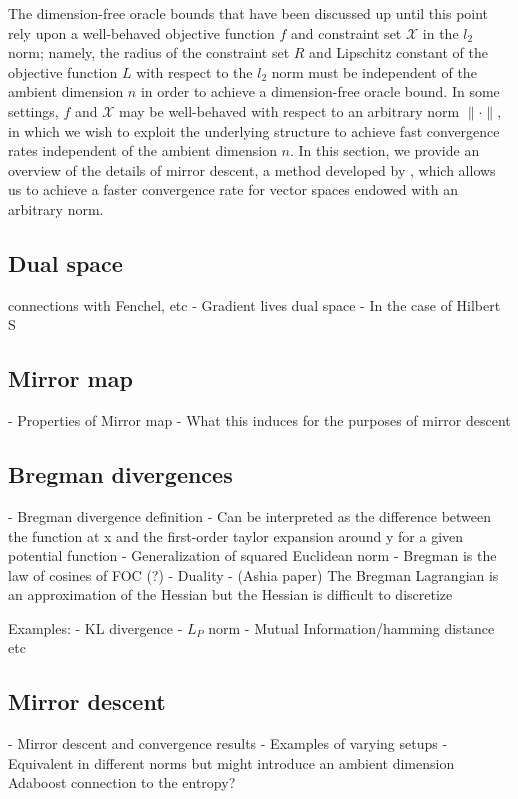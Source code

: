 

The dimension-free oracle bounds that have been discussed up until this point rely upon a well-behaved objective function $f$ and constraint set $\mathcal{X}$ in the $l_2$ norm; namely, the radius of the constraint set $R$ and Lipschitz constant of the objective function $L$ with respect to the $l_2$ norm must be independent of the ambient dimension $n$ in order to achieve a dimension-free oracle bound. In some settings, $f$ and $\mathcal{X}$ may be well-behaved with respect to an arbitrary norm $\|\cdot \|$, in which we wish to exploit the underlying structure to achieve fast convergence rates independent of the ambient dimension $n$. In this section, we provide an overview of the details of mirror descent, a method developed by \cite{blair1985problem}, which allows us to achieve a faster convergence rate for vector spaces endowed with an arbitrary norm. 


\subsection{Dual space}
connections with Fenchel, etc
- Gradient lives dual space
- In the case of Hilbert S

\subsection{Mirror map}
- Properties of Mirror map
- What this induces for the purposes of mirror descent

\subsection{Bregman divergences}
 - Bregman divergence definition
 - Can be interpreted as the difference between the function at x and the first-order taylor expansion around y for a given potential function
 - Generalization of squared Euclidean norm
 - Bregman is the law of cosines of FOC (?)
 - Duality
 - (Ashia paper) The Bregman Lagrangian is an approximation of the Hessian but the Hessian is difficult to discretize

Examples:
- KL divergence
- $L_P$ norm
- Mutual Information/hamming distance etc

\subsection{Mirror descent}
- Mirror descent and convergence results
- Examples of varying setups
- Equivalent in different norms but might introduce an ambient dimension
Adaboost connection to the entropy?

